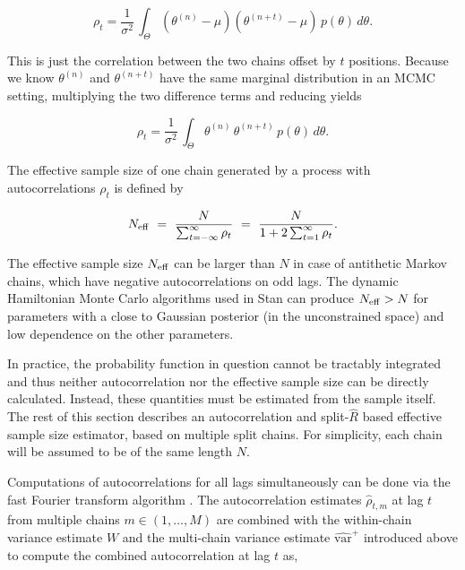 \documentclass[american,]{article}
\theoremstyle{definition}
\begin{document}
\begin{equation}
\rho_t = \frac{1}{\sigma^2} \, \int_{\Theta} (\theta^{(n)} - \mu)
(\theta^{(n+t)} - \mu) \, p(\theta) \, d \theta.
\end{equation}

This is just the correlation between the two chains offset by \(t\)
positions. Because we know \(\theta^{(n)}\) and \(\theta^{(n+t)}\) have
the same marginal distribution in an MCMC setting, multiplying the two
difference terms and reducing yields

\begin{equation}
\rho_t = \frac{1}{\sigma^2} \, \int_{\Theta} \theta^{(n)} \, \theta^{(n+t)}
\, p(\theta) \, d \theta.
\end{equation}

The effective sample size of one chain generated by a process with
autocorrelations \(\rho_t\) is defined by

\begin{equation}
N_{\rm eff} \ = \
\frac{N}{\sum_{t = -\infty}^{\infty} \rho_t} \ = \
\frac{N}{1 + 2 \sum_{t = 1}^{\infty} \rho_t}.
\end{equation}

The effective sample size \(N_{\rm eff}\) can be larger than \(N\) in case
of antithetic Markov chains, which have negative autocorrelations on odd
lags. The dynamic Hamiltonian Monte Carlo algorithms used in Stan
\citep{Hoffman+Gelman:2014, betancourt2017conceptual} can produce
\(N_{\rm eff}>N\) for parameters with a close to Gaussian posterior (in
the unconstrained space) and low dependence on the other parameters.

In practice, the probability function in question cannot be tractably
integrated and thus neither autocorrelation nor the effective sample
size can be directly calculated. Instead, these quantities must be estimated from
the sample itself. The rest of this section describes an
autocorrelation and split-\(\widehat{R}\) based effective sample size
estimator, based on multiple split chains. For simplicity, each chain
will be assumed to be of the same length \(N\).

Computations of autocorrelations for all lags simultaneously can be done
via the fast Fourier transform algorithm \citep[FFT; see][]{Geyer:2011}. 
The autocorrelation estimates \(\hat{\rho}_{t,m}\)
at lag \(t\) from multiple chains \(m \in (1,\ldots,M)\) are combined
with the within-chain variance estimate \(W\) and the multi-chain
variance estimate \(\widehat{\mbox{var}}^{+}\) introduced above to
compute the combined autocorrelation at lag \(t\) as,
\end{document}
